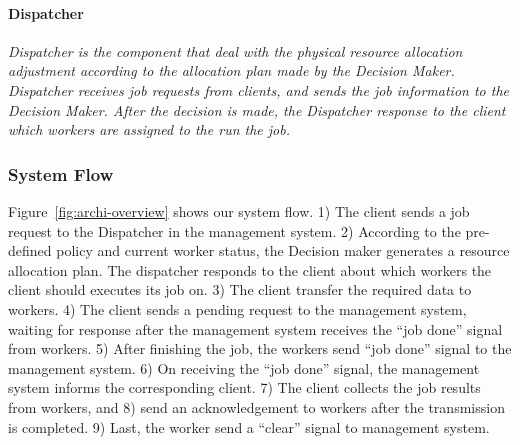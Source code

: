 \paragraph{Dispatcher}	%

\em{Dispatcher} is the component that deal with the physical resource
allocation adjustment according to the allocation plan made by the
\em{Decision Maker}.
\em{Dispatcher} receives job requests from clients, and sends the job
information to the \em{Decision Maker}.
After the decision is made, the \em{Dispatcher} response to the client
which \em{workers} are assigned to the run the \em{job}.



%  


\subsubsection{System Flow}	%

Figure~\ref{fig:archi-overview} shows our system flow.
1) The client sends a job request to the Dispatcher in the management 
system.
2) According to the pre-defined policy and current worker status, the 
Decision maker generates a resource allocation plan.
The dispatcher responds to the client about which workers the client 
should executes its job on.
3) The client transfer the required data to workers.
4) The client sends a pending request to the management system, waiting
for response after the management system receives the ``job done''
signal from workers.
5) After finishing the job, the workers send ``job done'' signal to the
management system.
6) On receiving the ``job done'' signal,  the management system informs
the corresponding client.
7) The client collects the job results from workers, and
8) send an acknowledgement to workers after the transmission is 
completed.
9) Last, the worker send a ``clear'' signal to management system.
